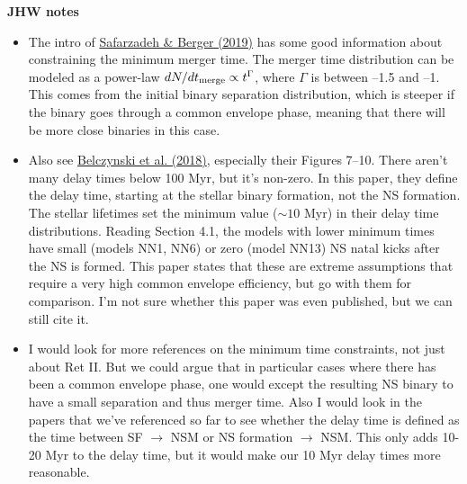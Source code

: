 \documentclass[11pt]{article}
\begin{document}
\noindent\textbf{JHW notes}
\begin{itemize}
  \item The intro of \href{https://ui.adsabs.harvard.edu/abs/2019ApJ...878L..12S/abstract}{Safarzadeh \& Berger (2019)} has some good information about constraining the minimum merger time.  The merger time distribution can be modeled as a power-law $dN/dt_{\rm merge} \propto t^\Gamma$, where $\Gamma$ is between --1.5 and --1.  This comes from the initial binary separation distribution, which is steeper if the binary goes through a common envelope phase, meaning that there will be more close binaries in this case.
  \item Also see \href{https://arxiv.org/abs/1812.10065}{Belczynski et al. (2018)}, especially their Figures 7--10.  There aren't many delay times below 100 Myr, but it's non-zero.   In this paper, they define the delay time, starting at the stellar binary formation, not the NS formation.  The stellar lifetimes set the minimum value ($\sim 10$ Myr) in their delay time distributions.  Reading Section 4.1, the models with lower minimum times have small (models NN1, NN6) or zero (model NN13) NS natal kicks after the NS is formed.  This paper states that these are extreme assumptions that require a very high common envelope efficiency, but go with them for comparison.  I'm not sure whether this paper was even published, but we can still cite it.
  \item I would look for more references on the minimum time constraints, not just about Ret II.  But we could argue that in particular cases where there has been a common envelope phase, one would except the resulting NS binary to have a small separation and thus merger time.  Also I would look in the papers that we've referenced so far to see whether the delay time is defined as the time between SF $\rightarrow$ NSM or NS formation $\rightarrow$ NSM.  This only adds 10-20 Myr to the delay time, but it would make our 10 Myr delay times more reasonable.
\end{itemize}
\end{document}
